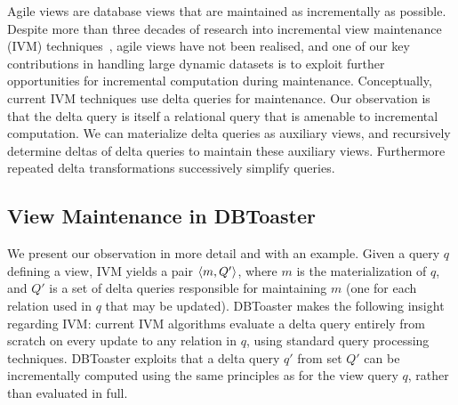 \label{sec:compilation}

Agile views are database views that are maintained as incrementally as possible.
Despite more than three decades of research into incremental view
maintenance (IVM)
techniques~\cite{roussopoulos-tods:91,griffin-sigmod:95,zhou-icde:07,zhou-vldb:07},
agile views have not been realised, and one of our key contributions in handling
large dynamic datasets is to exploit further opportunities for incremental
computation during maintenance.
Conceptually, current IVM techniques use delta queries for maintenance. Our
observation is that the delta query is itself a relational query that is
amenable to incremental computation. We can materialize delta queries as
auxiliary views, and recursively determine deltas of delta queries
to maintain these auxiliary views.
Furthermore repeated delta transformations successively simplify queries.


\subsection{View Maintenance in DBToaster}
We present our observation in more detail and with an example. Given a query $q$
defining a view, IVM yields a pair ${\langle m,Q'\rangle}$, where $m$ is the
materialization of $q$, and $Q'$ is a set of delta queries responsible for
maintaining $m$ (one for each relation used in $q$ that may be updated).
DBToaster makes the following insight regarding IVM: current IVM algorithms
evaluate a delta query entirely from scratch on every update to any relation
in $q$, using standard query processing techniques. DBToaster exploits that a
delta query $q'$ from set $Q'$
can be incrementally computed using the same principles as for
the view query $q$, rather than evaluated in full.

